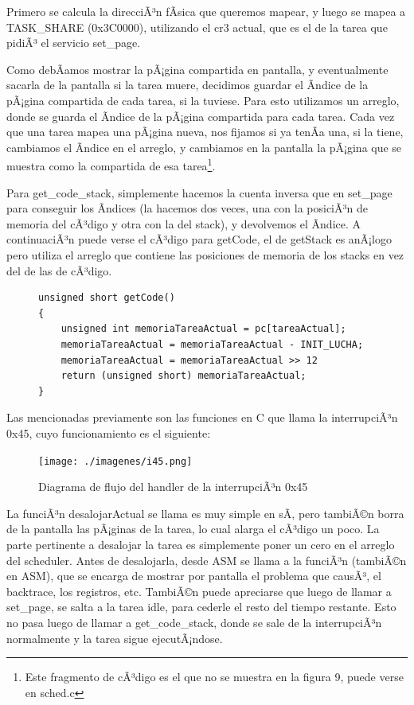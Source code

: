 \documentclass[10pt, a4paper]{article}
\begin{document}
Primero se calcula la direcciÃ³n fÃ­sica que queremos mapear, y luego se mapea a TASK\_SHARE (0x3C0000), utilizando el cr3 actual, que es el de la tarea que pidiÃ³ el servicio set\_page.

Como debÃ­amos mostrar la pÃ¡gina compartida en pantalla, y eventualmente sacarla de la pantalla si la tarea muere, decidimos guardar el Ã­ndice de la pÃ¡gina compartida de cada tarea, si la tuviese. Para esto utilizamos un arreglo, donde se guarda el Ã­ndice de la pÃ¡gina compartida para cada tarea. Cada vez que una tarea mapea una pÃ¡gina nueva, nos fijamos si ya tenÃ­a una, si la tiene, cambiamos el Ã­ndice en el arreglo, y cambiamos en la pantalla la pÃ¡gina que se muestra como la compartida de esa tarea\footnote{Este fragmento de cÃ³digo es el que no se muestra en la figura 9, puede verse en sched.c}.

Para get\_code\_stack, simplemente hacemos la cuenta inversa que en set\_page para conseguir los Ã­ndices (la hacemos dos veces, una con la posiciÃ³n de memoria del cÃ³digo y otra con la del stack), y devolvemos el Ã­ndice.
A continuaciÃ³n puede verse el cÃ³digo para getCode, el de getStack es anÃ¡logo pero utiliza el arreglo que contiene las posiciones de memoria de los stacks en vez del de las de cÃ³digo.
\begin{figure}[!h]
\begin{center}
\begin{verbatim}
unsigned short getCode()
{
	unsigned int memoriaTareaActual = pc[tareaActual];
	memoriaTareaActual = memoriaTareaActual - INIT_LUCHA;
	memoriaTareaActual = memoriaTareaActual >> 12
	return (unsigned short) memoriaTareaActual;
}
\end{verbatim}
\end{center}
\end{figure}

Las mencionadas previamente son las funciones en C que llama la interrupciÃ³n 0x45, cuyo funcionamiento es el siguiente:

	\begin{figure}[H]
  		\centering
		\texttt{[image: ./imagenes/i45.png]}
		\caption{Diagrama de flujo del handler de la interrupciÃ³n 0x45}
		\label{fig:i45}
	\end{figure}
	
La funciÃ³n desalojarActual se llama es muy simple en sÃ­, pero tambiÃ©n borra de la pantalla las pÃ¡ginas de la tarea, lo cual alarga el cÃ³digo un poco. La parte pertinente a desalojar la tarea es simplemente poner un cero en el arreglo del scheduler. Antes de desalojarla, desde ASM se llama a la funciÃ³n (tambiÃ©n en ASM), que se encarga de mostrar por pantalla el problema que causÃ³, el backtrace, los registros, etc.
TambiÃ©n puede apreciarse que luego de llamar a set\_page, se salta a la tarea idle, para cederle el resto del tiempo restante. Esto no pasa luego de llamar a get\_code\_stack, donde se sale de la interrupciÃ³n normalmente y la tarea sigue ejecutÃ¡ndose.
\end{document}
